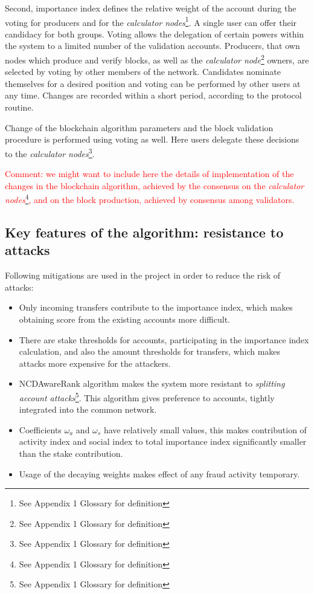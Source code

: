 \documentclass[a4paper,12pt]{article}
\begin{document}
Second, importance index defines the relative weight of the account during the voting for producers and for the \emph{calculator nodes}\footnote{See Appendix 1 Glossary for definition}. A single user can offer their candidacy for both groups. Voting allows the delegation of certain powers within the system to a limited number of the validation accounts. Producers, that own nodes which produce and verify blocks, as well as the \emph{calculator node}\footnote{See Appendix 1 Glossary for definition} owners, are selected by voting by other members of the network. Candidates nominate themselves for a desired position and voting can be performed by other users at any time. Changes are recorded within a short period, according to the protocol routine.

Change of the blockchain algorithm parameters and the block validation procedure is performed using voting as well. Here users delegate these decisions to the \emph{calculator nodes}\footnote{See Appendix 1 Glossary for definition}.



\textcolor{red}{Comment: we might want to include here the details of implementation of the changes in the blockchain algorithm, achieved by the consensus on the \emph{calculator nodes}\footnote{See Appendix 1 Glossary for definition}, and on the block production, achieved by consensus among validators.}


\subsection{Key features of the algorithm: resistance to attacks}

Following mitigations are used in the project in order to reduce the risk of attacks:

\begin{itemize}
  \item Only incoming transfers contribute to the importance index, which makes obtaining score from the existing accounts more difficult.
  \item There are stake thresholds for accounts, participating in the importance index calculation, and also the amount thresholds for transfers, which makes attacks more expensive for the attackers.
  \item NCDAwareRank algorithm makes the system more resistant to \emph{splitting account attacks}\footnote{See Appendix 1 Glossary for definition}. This algorithm gives preference to accounts, tightly integrated into the common network.
  \item Coefficients $\omega_a$ and $\omega_s$ have relatively small values, this makes contribution of activity index and social index to total importance index significantly smaller than the stake contribution.
  \item Usage of the decaying weights makes effect of any fraud activity temporary. 
\end{itemize}
\end{document}
